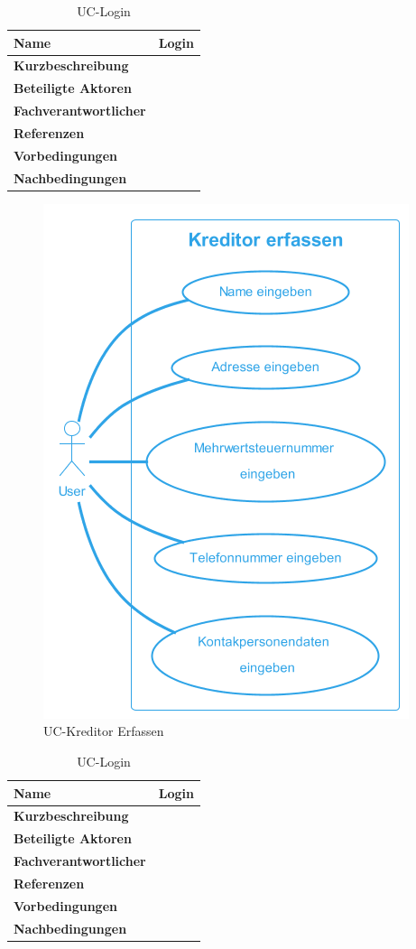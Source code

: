 \begin{table}[H]
  \centering
  \settowidth{}
  \setlength\extrarowheight{2pt}
  \begin{tabulary}{1.0\textwidth}{|a|m{12cm}|}
    \hline
    \textbf{Name}& Login\\
    \hline 
    \textbf{Kurzbeschreibung} & \\
    \hline
    \textbf{Beteiligte Aktoren} & \\
    \hline
    \textbf{Fachverantwortlicher} & \\
    \hline
    \textbf{Referenzen} & \\
    \hline
    \textbf{Vorbedingungen} & \\
    \hline
    \textbf{Nachbedingungen} & \\
    \hline
  \end{tabulary}
  \caption{UC-Login}
\end{table}

\begin{figure}[H]
  \begin{center}
    \includegraphics[width=0.4\linewidth]{content/diagrams/out/usecase/kreditorErfassen/Kreditor erfassen.png}
    \caption{UC-Kreditor Erfassen}
  \end{center}
  \label{kreditorErfassen}
\end{figure}

\begin{table}[H]
  \centering
  \settowidth{}
  \setlength\extrarowheight{2pt}
  \begin{tabulary}{1.0\textwidth}{|a|m{12cm}|}
    \hline
    \textbf{Name}& Login\\
    \hline 
    \textbf{Kurzbeschreibung} & \\
    \hline
    \textbf{Beteiligte Aktoren} & \\
    \hline
    \textbf{Fachverantwortlicher} & \\
    \hline
    \textbf{Referenzen} & \\
    \hline
    \textbf{Vorbedingungen} & \\
    \hline
    \textbf{Nachbedingungen} & \\
    \hline
  \end{tabulary}
  \caption{UC-Login}
\end{table}

